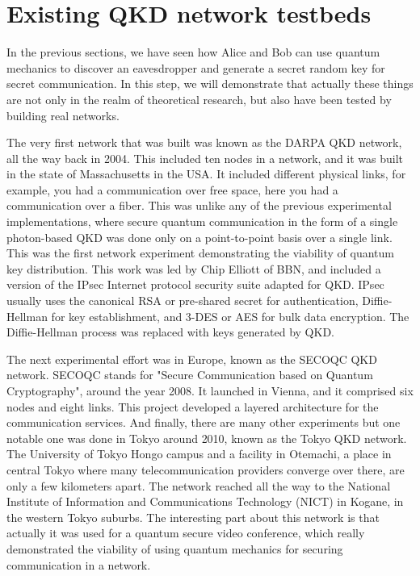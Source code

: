 \section{Existing QKD network testbeds}

In the previous sections, we have seen how Alice and Bob can use quantum mechanics to discover an eavesdropper and generate a secret random key for secret communication. In this step, we will demonstrate that actually these things are not only in the realm of theoretical research, but also have been tested by building real networks.

The very first network that was built was known as the DARPA QKD network, all the way back in 2004. This included ten nodes in a network, and it was built in the state of Massachusetts in the USA. It included different physical links, for example, you had a communication over free space, here you had a communication over a fiber. This was unlike any of the previous experimental implementations, where secure quantum communication in the form of a single photon-based QKD was done only on a point-to-point basis over a single link. This was the first network experiment demonstrating the viability of quantum key distribution.  This work was led by Chip Elliott of BBN, and included a version of the IPsec Internet protocol security suite adapted for QKD.  IPsec usually uses the canonical RSA or pre-shared secret for authentication, Diffie-Hellman for key establishment, and 3-DES or AES for bulk data encryption.  The Diffie-Hellman process was replaced with keys generated by QKD.

The next experimental effort was in Europe, known as the SECOQC QKD network. SECOQC stands for "Secure Communication based on Quantum Cryptography", around the year 2008. It launched in Vienna, and it comprised six nodes and eight links. This project developed a layered architecture for the communication services. And finally, there are many other experiments but one notable one was done in Tokyo around 2010, known as the Tokyo QKD network. The University of Tokyo Hongo campus and a facility in Otemachi, a place in central Tokyo where many telecommunication providers converge over there, are only a few kilometers apart.  The network reached all the way to the National Institute of Information and Communications Technology (NICT) in Kogane, in the western Tokyo suburbs. The interesting part about this network is that actually it was used for a quantum secure video conference, which really demonstrated the viability of using quantum mechanics for securing communication in a network.

